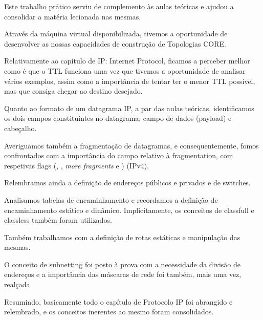 \documentclass{article}
\begin{document}
Este trabalho prático serviu de complemento às aulas teóricas e ajudou a consolidar a matéria lecionada nas mesmas.\par
Através da máquina virtual disponibilizada, tivemos a oportunidade de desenvolver as nossas capacidades de construção de Topologias CORE.\par 
Relativamente ao capítulo de IP: Internet Protocol, ficamos a perceber melhor como é que o TTL funciona uma vez que tivemos a oportunidade de analisar vários exemplos, assim como a importância de tentar ter o menor TTL possível, mas que consiga chegar ao destino desejado.\par
Quanto ao formato de um datagrama IP, a par das aulas teóricas, identificamos os dois campos constituintes no datagrama: campo de dados (payload) e cabeçalho.\par
Averiguamos também a fragmentação de datagramas, e consequentemente, fomos confrontados com a importância do campo relativo à fragmentation, com respetivas flags (, , \textit{more fragments} e ) (IPv4).\par
Relembramos ainda a definição de endereços públicos e privados e de switches.\par
Analisamos tabelas de encaminhamento e recordamos a definição de encaminhamento estático e dinâmico. Implicitamente, os conceitos de classfull e classless
também foram utilizados.\par
Também trabalhamos com a definição de rotas estáticas e manipulação das mesmas.\par
O conceito de subnetting foi posto à prova com a necessidade da divisão de endereços e a importância das máscaras de rede foi também, mais uma vez, realçada.\par
Resumindo, basicamente todo o capítulo de Protocolo IP foi abrangido e relembrado, e os conceitos inerentes ao mesmo foram consolidados.\par


\printindex
\end{document}
